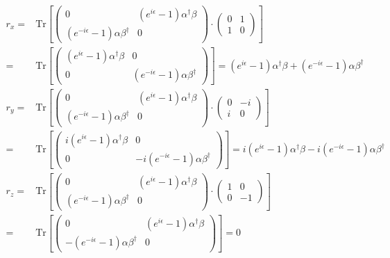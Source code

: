 \begin{equation}
  \begin{split}
    r_{x} = &  \text{Tr} \left[ \begin{pmatrix}
0 & (e^{i\epsilon}-1) \alpha^{\dag} \beta  \\
(e^{-i\epsilon}-1) \alpha \beta^{\dag}& 0
\end{pmatrix} \cdot \begin{pmatrix}
0&1\\
1&0
\end{pmatrix} \right]  \\
= & \text{Tr} \left[ \begin{pmatrix}
  (e^{i\epsilon}-1) \alpha^{\dag} \beta  & 0\\
0 &  (e^{-i\epsilon}-1) \alpha \beta^{\dag}
\end{pmatrix} \right] = (e^{i\epsilon}-1) \alpha^{\dag} \beta  + (e^{-i\epsilon}-1) \alpha \beta^{\dag} \\
r_{y} = &  \text{Tr} \left[ \begin{pmatrix}
  0 & (e^{i\epsilon}-1) \alpha^{\dag} \beta  \\
  (e^{-i\epsilon}-1) \alpha \beta^{\dag}& 0
  \end{pmatrix} \cdot \begin{pmatrix}
  0&-i\\
  i&0
  \end{pmatrix} \right]  \\
  = & \text{Tr} \left[ \begin{pmatrix}
    i(e^{i\epsilon}-1) \alpha^{\dag} \beta  & 0\\
  0 &  -i(e^{-i\epsilon}-1) \alpha \beta^{\dag}
  \end{pmatrix} \right] = i(e^{i\epsilon}-1) \alpha^{\dag} \beta  - i(e^{-i\epsilon}-1) \alpha \beta^{\dag} \\
  r_{z} = &  \text{Tr} \left[ \begin{pmatrix}
  0 & (e^{i\epsilon}-1) \alpha^{\dag} \beta  \\
  (e^{-i\epsilon}-1) \alpha \beta^{\dag}& 0
  \end{pmatrix} \cdot \begin{pmatrix}
  1&0\\
  0&-1
  \end{pmatrix} \right]  \\
  = & \text{Tr} \left[ \begin{pmatrix}
    0&(e^{i\epsilon}-1) \alpha^{\dag} \beta  \\
    -(e^{-i\epsilon}-1) \alpha \beta^{\dag}& 0
  \end{pmatrix} \right] = 0 \\
  \end{split}
\end{equation}

